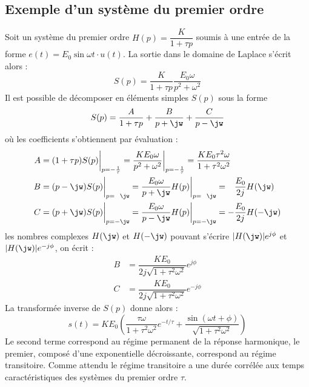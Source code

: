 \subsection{Exemple d'un système du premier ordre}
Soit un système du premier ordre $H(p)=\dfrac{K}{1+\tau p}$ soumis à une entrée
de la forme $e(t)=E_0\sin\omega t\cdot u(t)$. La sortie dans le domaine de
Laplace s'écrit alors :
\[
    S(p)=\dfrac{K}{1+\tau p}\dfrac{E_0\omega}{p^2+\omega^2}
\]
Il est possible de décomposer en éléments simples $S(p)$ sous la forme  
\[
    S(p)=\dfrac{A}{1+\tau p}+\dfrac{B}{p+\jw}+\dfrac{C}{p-\jw}
\]
où les coefficients s'obtiennent par évaluation :
\begin{align*}
    A&=(1+\tau p)S(p)\bigg|_{p=-\frac{1}{\tau}}=
       \dfrac{KE_0\omega}{p^2+\omega^2}\bigg|_{p=-\frac{1}{\tau}}=
       \dfrac{KE_0\tau^2\omega}{1+\tau^2\omega^2}\\
    B&=(p-\jw)S(p)\bigg|_{p=\hphantom{-}\jw}=
       \dfrac{E_0\omega}{p+\jw}H(p)\bigg|_{p=\hphantom{-}\jw}=
       \hphantom{-}\dfrac{E_0}{2j}H(\jw)\\
    C&=(p+\jw)S(p)\bigg|_{p=-\jw}=
       \dfrac{E_0\omega}{p-\jw}H(p)\bigg|_{p=-\jw}=
       -\dfrac{E_0}{2j}H(-\jw)
\end{align*}
les nombres complexes $H(\jw)$ et $H(-\jw)$ pouvant s'écrire 
$|H(\jw)|e^{j\phi}$ et $|H(\jw)|e^{-j\phi}$, on écrit :
\begin{align*}
    B &= \dfrac{KE_0}{2j\sqrt{1+\tau^2\omega^2}}e^{j\phi} \\
    C &= \dfrac{KE_0}{2j\sqrt{1+\tau^2\omega^2}}e^{-j\phi}
\end{align*}
La transformée inverse de $S(p)$ donne alors :
\[
    s(t)= KE_0\left( \dfrac{\tau\omega}{1+\tau^2\omega^2} e^{-t/\tau}
       + \dfrac{\sin{(\omega t+\phi)}}{\sqrt{1+\tau^2\omega^2}}\right)
\]
Le second terme correspond au régime permanent de la réponse harmonique,
le premier, composé d'une exponentielle décroissante, correspond au régime 
transitoire. Comme attendu le régime transitoire a une durée corrélée aux temps
caractéristiques des systèmes du premier ordre $\tau$.
